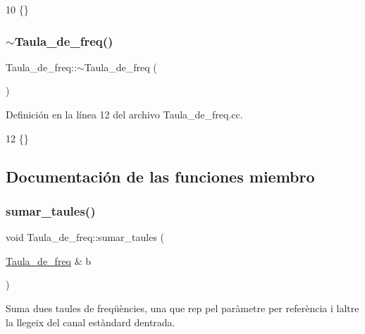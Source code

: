 \begin{DoxyCode}
10 \{\}
\end{DoxyCode}
\mbox{\label{class_taula__de__freq_a046a70a0ea38d03da605998cf99d5335}} 
\subsubsection{\texorpdfstring{$\sim$\+Taula\+\_\+de\+\_\+freq()}{~Taula\_de\_freq()}}
{\footnotesize\ttfamily Taula\+\_\+de\+\_\+freq\+::$\sim$\+Taula\+\_\+de\+\_\+freq (\begin{DoxyParamCaption}{ }\end{DoxyParamCaption})}



Definición en la línea 12 del archivo Taula\+\_\+de\+\_\+freq.\+cc.


\begin{DoxyCode}
12 \{\}
\end{DoxyCode}


\subsection{Documentación de las funciones miembro}
\mbox{\label{class_taula__de__freq_a59add68c3c129a8908907b038d6344f8}} 
\subsubsection{\texorpdfstring{sumar\+\_\+taules()}{sumar\_taules()}}
{\footnotesize\ttfamily void Taula\+\_\+de\+\_\+freq\+::sumar\+\_\+taules (\begin{DoxyParamCaption}\item[{\hyperlink{class_taula__de__freq}{Taula\+\_\+de\+\_\+freq} \&}]{b }\end{DoxyParamCaption})}



Suma dues taules de freqüències, una que rep pel paràmetre per referència i l\textquotesingle{}altre la llegeix del canal estàndard d\textquotesingle{}entrada. 

